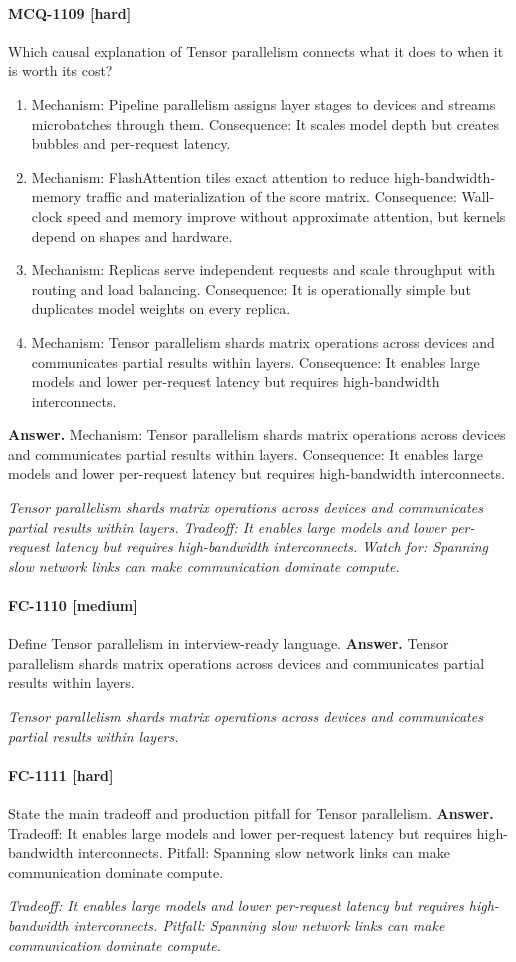\paragraph{MCQ-1109 [hard]} Which causal explanation of Tensor parallelism connects what it does to when it is worth its cost?
\begin{enumerate}[label=\Alph*.]
\item Mechanism: Pipeline parallelism assigns layer stages to devices and streams microbatches through them. Consequence: It scales model depth but creates bubbles and per-request latency.
\item Mechanism: FlashAttention tiles exact attention to reduce high-bandwidth-memory traffic and materialization of the score matrix. Consequence: Wall-clock speed and memory improve without approximate attention, but kernels depend on shapes and hardware.
\item Mechanism: Replicas serve independent requests and scale throughput with routing and load balancing. Consequence: It is operationally simple but duplicates model weights on every replica.
\item Mechanism: Tensor parallelism shards matrix operations across devices and communicates partial results within layers. Consequence: It enables large models and lower per-request latency but requires high-bandwidth interconnects.
\end{enumerate}
\noindent\textbf{Answer.} Mechanism: Tensor parallelism shards matrix operations across devices and communicates partial results within layers. Consequence: It enables large models and lower per-request latency but requires high-bandwidth interconnects.
\par\textit{Tensor parallelism shards matrix operations across devices and communicates partial results within layers. Tradeoff: It enables large models and lower per-request latency but requires high-bandwidth interconnects. Watch for: Spanning slow network links can make communication dominate compute.}
\paragraph{FC-1110 [medium]} Define Tensor parallelism in interview-ready language.
\noindent\textbf{Answer.} Tensor parallelism shards matrix operations across devices and communicates partial results within layers.
\par\textit{Tensor parallelism shards matrix operations across devices and communicates partial results within layers.}
\paragraph{FC-1111 [hard]} State the main tradeoff and production pitfall for Tensor parallelism.
\noindent\textbf{Answer.} Tradeoff: It enables large models and lower per-request latency but requires high-bandwidth interconnects. Pitfall: Spanning slow network links can make communication dominate compute.
\par\textit{Tradeoff: It enables large models and lower per-request latency but requires high-bandwidth interconnects. Pitfall: Spanning slow network links can make communication dominate compute.}
